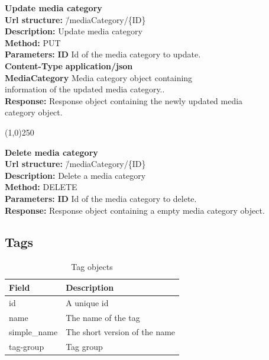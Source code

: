 \documentclass[11pt]{article}
\begin{document}
\begin{tabbing}
\textbf{Update media category} \\
\textcolor{black!60}{\textbf{Url structure:}} \hspace{0.2in} \= /mediaCategory/\{ID\} \\
\textcolor{black!60}{\textbf{Description:}}  \> Update media category \\
\textcolor{black!60}{\textbf{Method:}} \> PUT \\
\textcolor{black!60}{\textbf{Parameters:}} \> \textbf{ID} Id of the media category to update. \\
\textcolor{black!60}{\textbf{Content-Type}} \> \textbf{application/json} \\
\> \textbf{MediaCategory} Media category object containing 
\\ \> information of the updated media category.. \\
\textcolor{black!60}{\textbf{Response:}} \> Response object containing the newly updated media 
\\ \> category object.
\end{tabbing}

\begin{center}\line(1,0){250}\end{center}

\begin{tabbing}
\textbf{Delete media category} \\
\textcolor{black!60}{\textbf{Url structure:}} \hspace{0.2in} \= /mediaCategory/\{ID\} \\
\textcolor{black!60}{\textbf{Description:}}  \> Delete a media category \\
\textcolor{black!60}{\textbf{Method:}} \> DELETE \\
\textcolor{black!60}{\textbf{Parameters:}} \> \textbf{ID} Id of the media category to delete. \\
\textcolor{black!60}{\textbf{Response:}} \> Response object containing a empty media category object.
\end{tabbing}

\newpage

\subsection{Tags}

\begin{table}[H]
\caption{Tag objects}
\begin{center}
\begin{tabular}{|l|l|}
\hline
 Field                     &  Description                    \\
\hline
 id                        &  A unique id                    \\
 name                      &  The name of the tag            \\
 simple\_name  &  The short version of the name  \\
 tag-group                 &  Tag group                      \\
\hline
\end{tabular}
\end{center}
\end{table}
\end{document}
